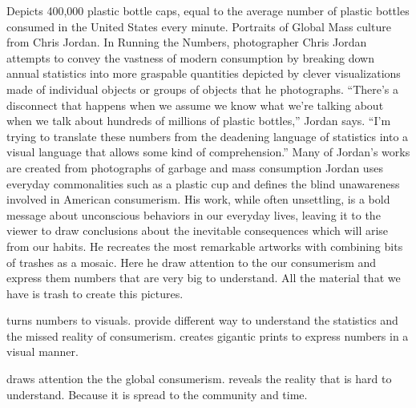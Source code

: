 Depicts 400,000 plastic bottle caps, equal to the average number of plastic bottles consumed in the United States every minute. Portraits of Global Mass culture from Chris Jordan. In Running the Numbers, photographer Chris Jordan attempts to convey the vastness of modern consumption by breaking down annual statistics into more graspable quantities depicted by clever visualizations made of individual objects or groups of objects that he photographs. “There’s a disconnect that happens when we assume we know what we’re talking about when we talk about hundreds of millions of plastic bottles,” Jordan says. “I’m trying to translate these numbers from the deadening language of statistics into a visual language that allows some kind of comprehension.” Many of Jordan's works are created from photographs of garbage and mass consumption Jordan uses everyday commonalities such as a plastic cup and defines the blind unawareness involved in American consumerism. His work, while often unsettling, is a bold message about unconscious behaviors in our everyday lives, leaving it to the viewer to draw conclusions about the inevitable consequences which will arise from our habits. He recreates the most remarkable artworks with combining bits of trashes as a mosaic. Here he draw attention to the our consumerism and express them numbers that are very big to understand. All the material that we have is trash to create this pictures.

turns numbers to visuals. provide different way to understand the statistics and the missed reality of consumerism. creates gigantic prints to express numbers in a visual manner.

draws attention the the global consumerism. reveals the reality that is hard to understand. Because it is spread to the community and time. 



